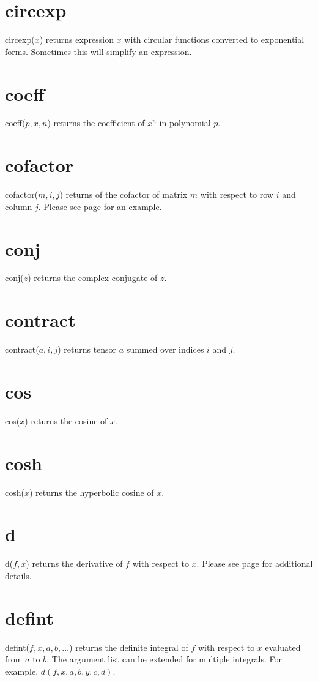 \documentclass[12pt]{book}
\begin{document}
\section*{circexp}
circexp($x$) returns expression $x$ with circular functions converted
to exponential forms.
Sometimes this will simplify an expression.

\section*{coeff}
coeff($p,x,n$) returns the coefficient of $x^n$ in polynomial $p$.

\section*{cofactor}
cofactor($m,i,j$) returns of the cofactor of matrix $m$ with respect to row $i$ and column $j$.
Please see page \pageref{cofactor} for an example.

\section*{conj}
conj($z$) returns the complex conjugate of $z$.

\section*{contract}
contract($a,i,j$) returns tensor $a$ summed over indices $i$ and $j$.

\section*{cos}
cos($x$) returns the cosine of $x$.

\section*{cosh}
cosh($x$) returns the hyperbolic cosine of $x$.

\section*{d}
d($f,x$) returns the derivative of $f$ with respect to $x$.
Please see page \pageref{d} for additional details.

\section*{defint}
defint($f,x,a,b,\ldots$)
returns the definite integral of $f$ with respect to $x$ evaluated from $a$ to $b$.
The argument list can be extended for multiple integrals.
For example, $d(f,x,a,b,y,c,d)$.
\end{document}
